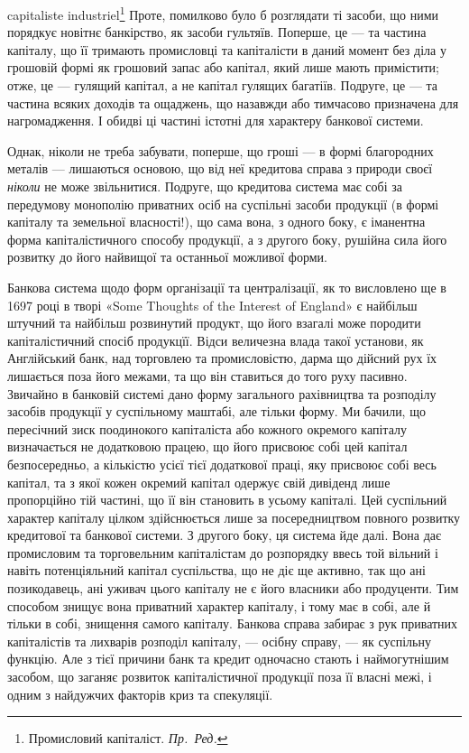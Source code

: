 \parcont{}  %
capitaliste industriel\footnote*{
Промисловий капіталіст. \emph{Пр.~Ред.}
} Проте, помилково було б розглядати ті засоби, що ними
порядкує новітнє банкірство, як засоби гультяїв. Поперше, це — та частина
капіталу, що її тримають промисловці та капіталісти в даний момент без діла
у грошовій формі як грошовий запас або капітал, який лише мають примістити;
отже, це — гулящий капітал, а не капітал гулящих багатіїв. Подруге, це — та
частина всяких доходів та ощаджень, що назавжди або тимчасово призначена
для нагромадження. І обидві ці частині істотні для характеру банкової системи.

Однак, ніколи не треба забувати, поперше, що гроші — в формі благородних
металів — лишаються основою, що від неї кредитова справа з природи
своєї \emph{ніколи} не може звільнитися. Подруге, що кредитова система має собі
за передумову монополію приватних осіб на суспільні засоби продукції (в формі
капіталу та земельної власності!), що сама вона, з одного боку, є іманентна
форма капіталістичного способу продукції, а з другого боку, рушійна сила його
розвитку до його найвищої та останньої можливої форми.

Банкова система щодо форм організації та централізації, як то висловлено
ще в 1697 році в творі «Some Thoughts of the Interest of England» є найбільш
штучний та найбільш розвинутий продукт, що його взагалі може породити
капіталістичний спосіб продукцїї. Відси величезна влада такої установи,
як Англійський банк, над торговлею та промисловістю, дарма що дійсний рух
їх лишається поза його межами, та що він ставиться до того руху пасивно.
Звичайно в банковій системі дано форму загального рахівництва та розподілу
засобів продукції у суспільному маштабі, але тільки форму. Ми бачили, що пересічний
зиск поодинокого капіталіста або кожного окремого капіталу визначається
не додатковою працею, що його присвоює собі цей капітал безпосередньо,
а кількістю усієї тієї додаткової праці, яку присвоює собі весь капітал, та з якої
кожен окремий капітал одержує свій дивіденд лише пропорційно тій частині, що
її він становить в усьому капіталі. Цей суспільний характер капіталу цілком
здійснюється лише за посередництвом повного розвитку кредитової та банкової
системи. З другого боку, ця система йде далі. Вона дає промисловим та торговельним
капіталістам до розпорядку ввесь той вільний і навіть потенціяльний
капітал суспільства, що не діє ще активно, так що ані позикодавець, ані уживач
цього капіталу не є його власники або продуценти. Тим способом знищує
вона приватний характер капіталу, і тому має в собі, але й тільки в собі, знищення
самого капіталу. Банкова справа забирає з рук приватних капіталістів
та лихварів розподіл капіталу, — осібну справу, — як суспільну функцію. Але
з тієї причини банк та кредит одночасно стають і наймогутнішим засобом, що
заганяє розвиток капіталістичної продукції поза її власні межі, і одним з найдужчих
факторів криз та спекуляції.

